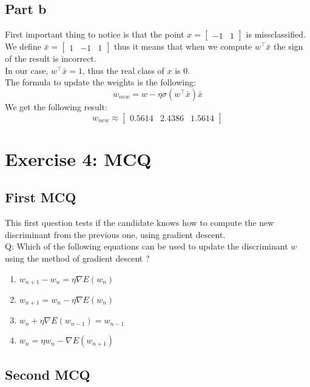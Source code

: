 \documentclass[a4paper, 10pt]{article}
\begin{document}
\subsection{Part b}
First important thing to notice is that the point $x=\begin{bmatrix}-1 & 1\end{bmatrix}$ is missclassified.
We define $\bar{x} = \begin{bmatrix}1 & -1 & 1\end{bmatrix}$ thus it means that when we compute 
$w^\top \bar{x}$ the sign of the result is incorrect.
\\
In our case, $w^\top \bar{x} = 1$, thus the real class of $x$ is $0$.
\\
The formula to update the weights is the following:
$$
w_{new} = w - \eta \sigma(w^\top \bar{x})\bar{x}
$$
We get the following result:
$$
w_{new} \approx \begin{bmatrix}0.5614 & 2.4386 & 1.5614\end{bmatrix}
$$



\section{Exercise 4: MCQ}
\subsection{First MCQ}
This first question tests if the candidate knows how to compute the new
discriminant from the previous one, using gradient descent.
\\
Q: Which of the following equations can be used to update the discriminant $w$ using
the method of gradient descent ?
\\
\begin{enumerate}
    \item $w_{n+1} - w_{n} =  \eta \nabla E(w_{n})$
    \item $w_{n+1} = w_{n} - \eta \nabla E(w_{n})$
    \item $w_{n} + \eta \nabla E(w_{n-1}) = w_{n-1} $
    \item $w_{n} = \eta w_{n} - \nabla E(w_{n+1})$
\end{enumerate}
\subsection{Second MCQ}
\end{document}
